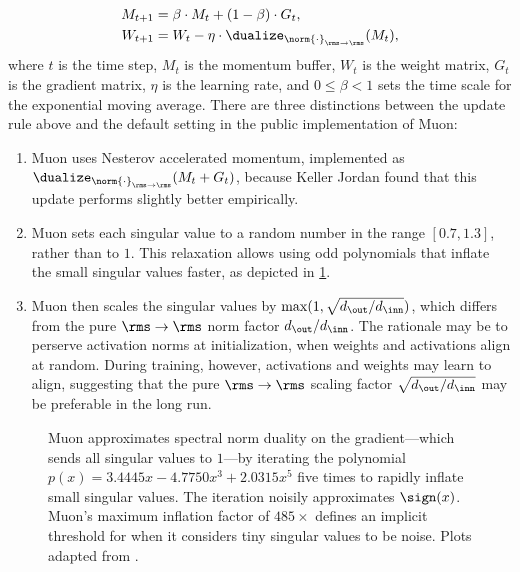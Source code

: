 \begin{align}
    M_{t+1} &= \beta \cdot M_t + (1 - \beta) \cdot G_t, \\
    W_{t+1} &= W_t - \eta \cdot \dualize_{\norm{\cdot}_{\rms \to \rms}}(M_t),
\end{align}
where $t$ is the time step, $M_t$ is the momentum buffer, $W_t$ is the weight matrix, $G_t$ is the gradient matrix,  $\eta$ is the learning rate, and $0 \leq \beta < 1$ sets the time scale for the exponential moving average. There are three distinctions between the update rule above and the default setting in the public implementation of Muon:

\begin{enumerate}
    \item Muon uses Nesterov accelerated momentum, implemented as $\dualize_{\norm{\cdot}_{\rms \to \rms}}(M_t + G_t)$, because Keller Jordan found that this update performs slightly better empirically.
    \item Muon sets each singular value to a random number in the range $[0.7, 1.3]$, rather than to $1$. This relaxation allows using odd polynomials that inflate the small singular values faster, as depicted in \cref{fig:muon-newton-schulz}.
    \item Muon then scales the singular values by $\max(1, \sqrt{d_\out / d_\inn})$, which differs from the pure $\rms\to\rms$ norm factor $d_\out / d_\inn$. The rationale may be to perserve activation norms at initialization, when weights and activations align at random. During training, however, activations and weights may learn to align, suggesting that the pure $\rms \to \rms$ scaling factor $\sqrt{d_\out / d_\inn}$ may be preferable in the long run.
\end{enumerate}

\begin{figure}[t]
    \centering
    \subfloat{
        
    }
    \hspace{0.03\textwidth}
    \subfloat{
        
    }
    \caption{Muon approximates spectral norm duality on the gradient---which sends all singular values to $1$---by iterating the polynomial $p(x) = 3.4445x - 4.7750x^3 + 2.0315x^5$ five times to rapidly inflate small singular values. The iteration noisily approximates $\sign(x)$. Muon's maximum inflation factor of $485\times$ defines an implicit threshold for when it considers tiny singular values to be noise. Plots adapted from \citet{modula-docs}.}  %
    \label{fig:muon-newton-schulz}
\end{figure}

